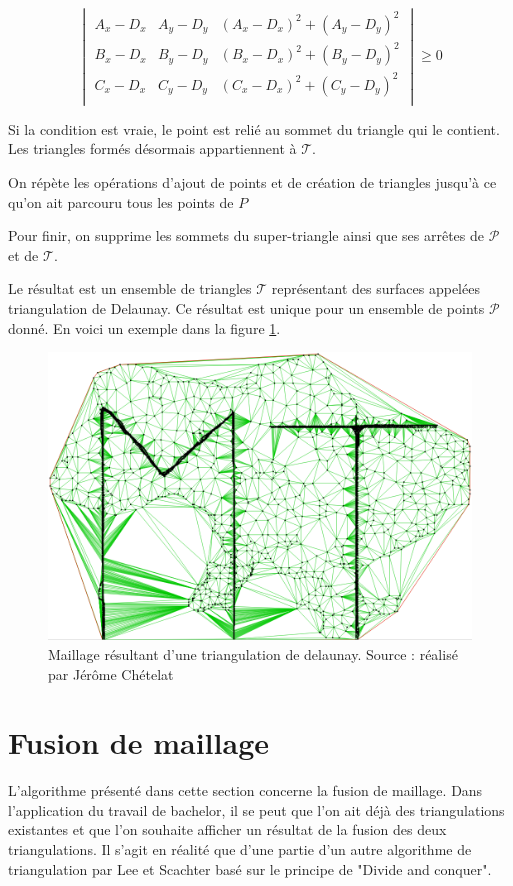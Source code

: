 $$
\begin{vmatrix}
 A_x - D_x & A_y - D_y & (A_x - D_x)^2 + (A_y - D_y)^2 \\
 B_x - D_x & B_y - D_y & (B_x - D_x)^2 + (B_y - D_y)^2 \\
 C_x - D_x & C_y - D_y & (C_x - D_x)^2 + (C_y - D_y)^2 \\
\end{vmatrix} \geqslant 0
$$

Si la condition est vraie, le point est relié au sommet du triangle qui le contient. Les triangles formés désormais appartiennent à $\mathcal{T}$.

On répète les opérations d'ajout de points et de création de triangles jusqu'à ce qu'on ait parcouru tous les points de $P$

Pour finir, on supprime les sommets du super-triangle ainsi que ses arrêtes de $\mathcal{P}$ et de $\mathcal{T}$.

Le résultat est un ensemble de triangles $\mathcal{T}$ représentant des surfaces appelées triangulation de Delaunay.
Ce résultat est unique pour un ensemble de points $\mathcal{P}$ donné.
En voici un exemple dans la figure \ref{fig:example_delaunay}.


\begin{figure}[htbp!]
    \centering
    \includegraphics[width=0.8\linewidth]{figures/example_delaunay.png}
    \caption{Maillage résultant d'une triangulation de delaunay. Source : réalisé par Jérôme Chételat}
    \label{fig:example_delaunay}
\end{figure}


\section{Fusion de maillage}

L'algorithme présenté dans cette section concerne la fusion de maillage. Dans l'application du travail de bachelor, il se peut que l'on ait déjà des triangulations existantes et que l'on souhaite afficher un résultat de la fusion des deux triangulations. Il s'agit en réalité que d'une partie d'un autre algorithme de triangulation par Lee et Scachter basé sur le principe de "Divide and conquer".



